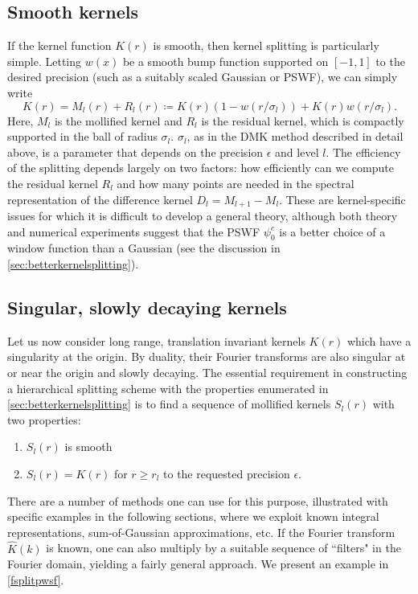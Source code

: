 \documentclass[final,letterpaper]{siamart171218}
\newcommand{\be}{\begin{equation}}
\newcommand{\ee}{\end{equation}}
\newcommand{\psic}{{\psi_0^c}}
\newcommand{\acron}{DMK }
\newcommand{\cR}{r}
\begin{document}
\subsection{Smooth kernels}

If the kernel function $K(r)$ is smooth, then kernel splitting is particularly simple.
Letting $w(x)$ be a smooth bump function supported on $[-1,1]$ to the desired precision
(such as a suitably scaled Gaussian or PSWF), we can simply write 
\be\label{smoothkernelsplitting}
K(r) = M_l(r)+R_l(r) \coloneqq K(r) (1-w(r/\sigma_l)) + K(r) w(r/\sigma_l).
\ee
Here, 
$M_l$ is the mollified kernel and $R_l$ is the residual kernel, which is compactly supported
in the ball of radius $\sigma_l$.
$\sigma_l$, as in the \acron method described in detail above, is a parameter that
depends on the precision
$\epsilon$ and level $l$. The efficiency of the splitting depends largely on two factors:
how efficiently can we compute the residual kernel $R_l$ and
how many points are needed in the spectral representation of the 
difference kernel $D_l=M_{l+1}-M_{l}$. 
These are kernel-specific issues for which it is difficult to develop a general theory,
although both theory and numerical experiments suggest that 
the PSWF $\psic$ is a better choice of a window function than a Gaussian (see the
discussion in \cref{sec:betterkernelsplitting}).

\subsection{Singular, slowly decaying kernels}

Let us now consider long range, translation invariant kernels $K(r)$ which have a 
singularity at the origin. By duality, their
Fourier transforms are also singular at or near the origin and
slowly decaying. 
The essential requirement in constructing a hierarchical splitting scheme with the
properties enumerated in \cref{sec:betterkernelsplitting} is to find a sequence of
mollified kernels $S_l(r)$ with two properties:
\begin{enumerate}
\item $S_l(r)$ is smooth 
\item $S_l(r) = K(r)$ for $r\ge \cR_l$ to the requested
precision $\epsilon$. 
\end{enumerate}

There are a number of methods one can use for this purpose, illustrated
with specific examples in the following sections, where we exploit
known integral representations, sum-of-Gaussian approximations, etc.
If the Fourier transform $\widehat{K}(k)$ is known, 
one can also multiply by a suitable sequence of ``filters" in the Fourier domain, yielding
a fairly general approach.  We present an example in \cref{fsplitpwsf}.
\end{document}
